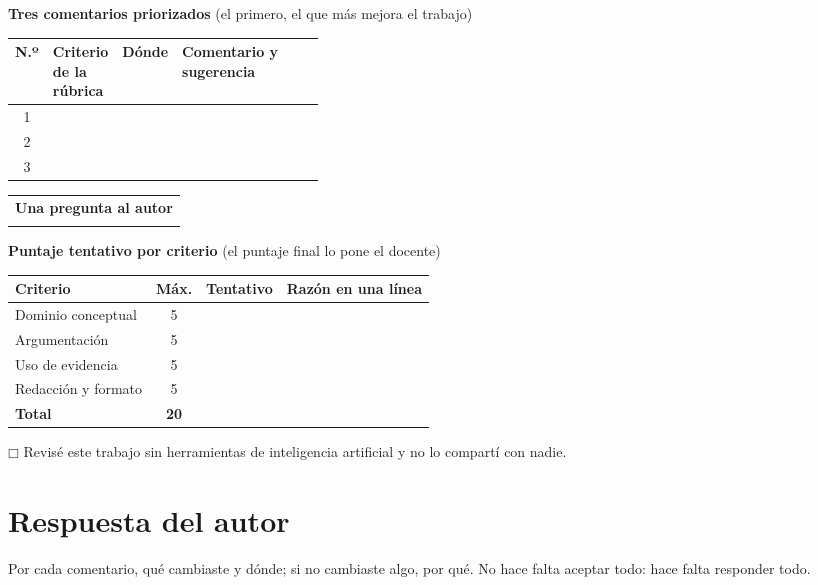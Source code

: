 \documentclass{academic-report}
\begin{document}
\vspace{0.5em}\noindent
\textbf{Tres comentarios priorizados} (el primero, el que más mejora el trabajo)

\noindent
\begin{tabularx}{\linewidth}{|c|>{\raggedright\arraybackslash}p{0.22\linewidth}|p{0.14\linewidth}|X|}
\hline
\textbf{N.º} & \textbf{Criterio de la rúbrica} & \textbf{Dónde} & \textbf{Comentario y sugerencia} \\
\hline
1 & & & \rule[-1.8cm]{0pt}{1.8cm} \\
\hline
2 & & & \rule[-1.8cm]{0pt}{1.8cm} \\
\hline
3 & & & \rule[-1.8cm]{0pt}{1.8cm} \\
\hline
\end{tabularx}

\vspace{0.5em}\noindent
\begin{tabularx}{\linewidth}{|X|}
\hline
\textbf{Una pregunta al autor} \\
\rule[-1.1cm]{0pt}{1.1cm} \\
\hline
\end{tabularx}

\vspace{0.5em}\noindent
\textbf{Puntaje tentativo por criterio} (el puntaje final lo pone el docente)

\noindent
\begin{tabularx}{\linewidth}{|l|c|c|X|}
\hline
\textbf{Criterio} & \textbf{Máx.} & \textbf{Tentativo} & \textbf{Razón en una línea} \\
\hline
Dominio conceptual  & 5 & & \\[0.6em]
\hline
Argumentación       & 5 & & \\[0.6em]
\hline
Uso de evidencia    & 5 & & \\[0.6em]
\hline
Redacción y formato & 5 & & \\[0.6em]
\hline
\textbf{Total}      & \textbf{20} & & \\[0.6em]
\hline
\end{tabularx}

\vspace{0.3em}\noindent
$\mdlgwhtsquare$ Revisé este trabajo sin herramientas de inteligencia artificial y no lo compartí con nadie.

\newpage
\section*{Respuesta del autor}
Por cada comentario, qué cambiaste y dónde; si no cambiaste algo, por qué. No hace falta aceptar
todo: hace falta responder todo.
\end{document}
